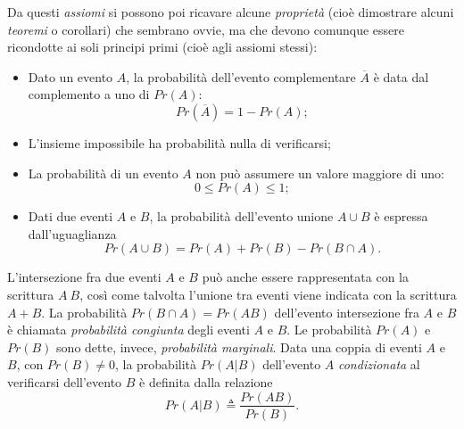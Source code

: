 \documentclass[12pt,oneside,openany]{memoir}
\numberwithin{equation}{subsection}
\begin{document}
Da questi \textit{assiomi} si possono poi ricavare alcune \textit{propriet\`a}
(cio\`e dimostrare alcuni \textit{teoremi} o corollari) che sembrano ovvie, ma
che devono comunque essere ricondotte ai soli principi primi (cio\`e agli
assiomi stessi):
\begin{itemize}
    \item Dato un evento $A$, la probabilit\`a dell'evento complementare
        $\overline{A}$ \`e data dal complemento a uno di $Pr(A)$:
        \[
            Pr(\overline{A}) = 1 - Pr(A);
        \]
    \item L'insieme impossibile ha probabilit\`a nulla di verificarsi;
    \item La probabilit\`a di un evento $A$ non pu\`o assumere un valore
        maggiore di uno:
        \[
            0 \leq Pr(A) \leq 1;
        \]
    \item Dati due eventi $A$ e $B$, la probabilit\`a dell'evento unione
        $A \cup B$ \`e espressa dall'uguaglianza
        \[
            Pr(A \cup B) = Pr(A) + Pr(B) - Pr(B \cap A).
        \]
\end{itemize}
L'intersezione fra due eventi $A$ e $B$ pu\`o anche essere rappresentata con la
scrittura $A \ B$, cos\`i come talvolta l'unione tra eventi viene indicata con
la scrittura $A + B$. La probabilit\`a $Pr(B \cap A) = Pr(A B)$ dell'evento
intersezione fra $A$ e $B$ \`e chiamata \textit{probabilit\`a congiunta} degli
eventi $A$ e $B$. Le probabilit\`a $Pr(A)$ e $Pr(B)$ sono dette, invece,
\textit{probabilit\`a marginali}.
\bigbreak
Data una coppia di eventi $A$ e $B$, con $Pr(B) \neq 0$, la probabilit\`a
$Pr(A|B)$ dell'evento $A$ \textit{condizionata} al verificarsi dell'evento $B$
\`e definita dalla relazione
\[
    Pr(A|B) \triangleq \frac{Pr(AB)}{Pr(B)}.
\]

\end{document}
